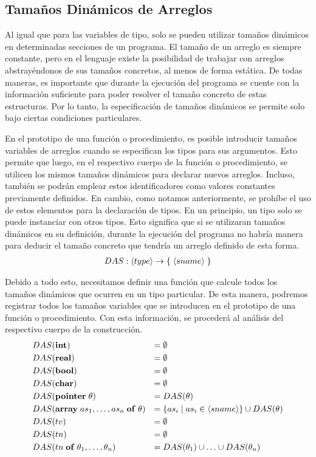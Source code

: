 \subsection{Tamaños Dinámicos de Arreglos}

Al igual que para las variables de tipo, solo se pueden utilizar tamaños dinámicos en determinadas secciones de un programa.
El tamaño de un arreglo es siempre constante, pero en el lenguaje existe la posibilidad de trabajar con arreglos abstrayéndonos de sus tamaños concretos, al menos de forma estática.
De todas maneras, es importante que durante la ejecución del programa se cuente con la información suficiente para poder resolver el tamaño concreto de estas estructuras.
Por lo tanto, la especificación de tamaños dinámicos se permite solo bajo ciertas condiciones particulares.

En el prototipo de una función o procedimiento, es posible introducir tamaños variables de arreglos cuando se especifican los tipos para sus argumentos.
Esto permite que luego, en el respectivo cuerpo de la función o procedimiento, se utilicen los mismos tamaños dinámicos para declarar nuevos arreglos.
Incluso, también se podrán emplear estos identificadores como valores constantes previamente definidos.
En cambio, como notamos anteriormente, se prohíbe el uso de estos elementos para la declaración de tipos.
En un principio, un tipo solo se puede instanciar con otros tipos.
Esto significa que si se utilizaran tamaños dinámicos en su definición, durante la ejecución del programa no habría manera para deducir el tamaño concreto que tendría un arreglo definido de esta forma.
\begin{gather*}
DAS: \langle type \rangle \rightarrow \{ \; \langle sname \rangle \; \}
\end{gather*}

Debido a todo esto, necesitamos definir una función que calcule todos los tamaños dinámicos que ocurren en un tipo particular.
De esta manera, podremos registrar todos los tamaños variables que se introducen en el prototipo de una función o procedimiento.
Con esta información, se procederá al análisis del respectivo cuerpo de la construcción.
\begin{align*}
&DAS(\mathbf{int})
&=&\;
\emptyset
\\
&DAS(\mathbf{real})
&=&\;
\emptyset
\\
&DAS(\mathbf{bool})
&=&\;
\emptyset
\\
&DAS(\mathbf{char})
&=&\;
\emptyset
\\
&DAS(\mathbf{pointer} \; \theta)
&=&\;
DAS(\theta)
\\
&DAS(\mathbf{array} \; as_1, \ldots, as_n \; \mathbf{of} \; \theta)
&=&\;
\{ as_i \mid as_i \in \langle sname \rangle \} \cup DAS(\theta)
\\
&DAS(tv)
&=&\;
\emptyset
\\
&DAS(tn)
&=&\;
\emptyset
\\
&DAS(tn \; \mathbf{of} \; \theta_1, \ldots, \theta_n)
&=&\;
DAS(\theta_1) \cup \ldots \cup DAS(\theta_n)
\end{align*}

